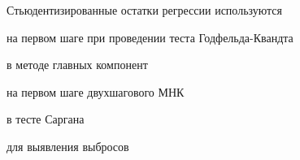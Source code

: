 
\begin{question}
Стьюдентизированные остатки регрессии используются
\begin{answerlist}
  \item на первом шаге при проведении теста Годфельда-Квандта
  \item в методе главных компонент
  \item на первом шаге двухшагового МНК
  \item в тесте Саргана
  \item для выявления выбросов
\end{answerlist}
\end{question}


